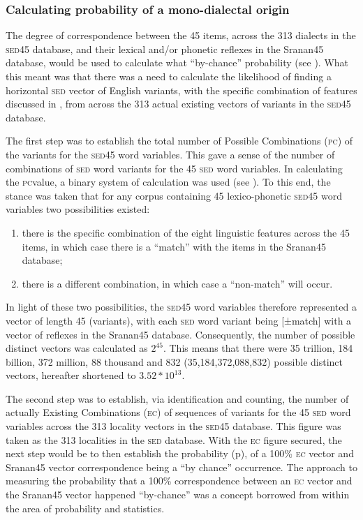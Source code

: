 {{{{{{{{{\subsubsection{Calculating probability of a mono-dialectal origin} \label{3.4.3.1}
The degree of correspondence between the 45 items, across the 313 dialects in the \textsc{sed45} database, and their lexical and/or phonetic reflexes in the Sranan45 database, would be used to calculate what ``by-chance'' probability (see ). What this meant was that there was a need to calculate the likelihood of finding a horizontal \textsc{sed} vector of English variants, with the specific combination of features discussed in , from across the 313 actual existing vectors of variants in the \textsc{sed45} database.

The first step was to establish the total number of Possible Combinations (\textsc{pc}) of the variants for the \textsc{sed45} word variables. This gave a sense of the number of combinations of \textsc{sed} word variants for the 45 \textsc{sed} word variables. In calculating the \textsc{pc}value, a binary system of calculation was used (see ). To this end, the stance was taken that for any corpus containing 45 lexico-phonetic \textsc{sed45} word variables two possibilities existed:

\begin{enumerate}
  \item {there is the specific combination of the eight linguistic features across the 45 items, in which case there is a ``match'' with the items in the Sranan45 database;}
  \item {there is a different combination, in which case a ``non-match'' will occur.}
\end{enumerate}

In light of these two possibilities, the \textsc{sed45} word variables therefore represented a vector of length 45 (variants), with each \textsc{sed} word variant being [±match] with a vector of reflexes in the Sranan45 database. Consequently, the number of possible distinct vectors was calculated as $2^{45}$. This means that there were 35 trillion, 184 billion, 372 million, 88 thousand and 832 (35,184,372,088,832) possible distinct vectors, hereafter shortened to $3.52\ast10^{13}$.

The second step was to establish, via identification and counting, the number of actually Existing Combinations (\textsc{ec}) of sequences of variants for the 45 \textsc{sed} word variables across the 313 locality vectors in the \textsc{sed45} database. This figure was taken as the 313 localities in the \textsc{sed} database. With the \textsc{ec} figure secured, the next step would be to then establish the probability (p), of a 100\% \textsc{ec} vector and Sranan45 vector correspondence being a ``by chance'' occurrence. The approach to measuring the probability that a 100\% correspondence between an \textsc{ec} vector and the Sranan45 vector happened ``by-chance'' was a concept borrowed from within the area of probability and statistics.

}}}}}}}}}
